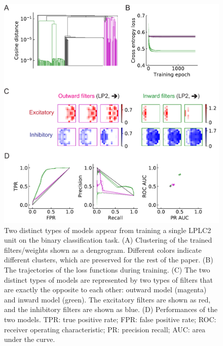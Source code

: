\documentclass[pdftex,9pt,lineno]{elife}
\begin{document}
\begin{figure}
\label{fig:model}
\end{figure}

\begin{figure}
\includegraphics[width=\linewidth]{figures/trained_results_Q1_paper.pdf}
\caption{Two distinct types of models appear from training a single LPLC2 unit on the binary classification task. (A) Clustering of the trained filters/weights shown as a dengrogram. Different colors indicate different clusters, which are preserved for the rest of the paper. (B) The trajectories of the loss functions during training. (C) The two distinct types of models are represented by two types of filters that are exactly the opposite to each other: outward model (magenta) and inward model (green). The excitatory filters are shown as red, and the inhibitory filters are shown as blue. (D) Performances of the two models. TPR: true positive rate; FPR: false positive rate; ROC: receiver operating characteristic; PR: precision recall; AUC: area under the curve.}

\end{figure}
\end{document}
